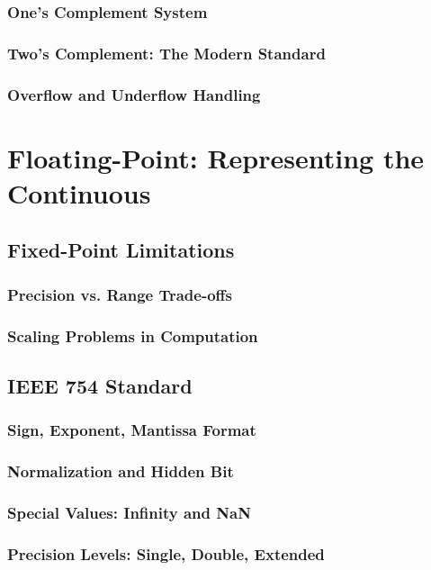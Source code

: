 \documentclass[12pt, oneside, openany]{book}
\begin{document}
\subsubsection{One's Complement System}
\subsubsection{Two's Complement: The Modern Standard}
\subsubsection{Overflow and Underflow Handling}

\section{Floating-Point: Representing the Continuous}
\subsection{Fixed-Point Limitations}
\subsubsection{Precision vs. Range Trade-offs}
\subsubsection{Scaling Problems in Computation}

\subsection{IEEE 754 Standard}
\subsubsection{Sign, Exponent, Mantissa Format}
\subsubsection{Normalization and Hidden Bit}
\subsubsection{Special Values: Infinity and NaN}
\subsubsection{Precision Levels: Single, Double, Extended}
\end{document}
